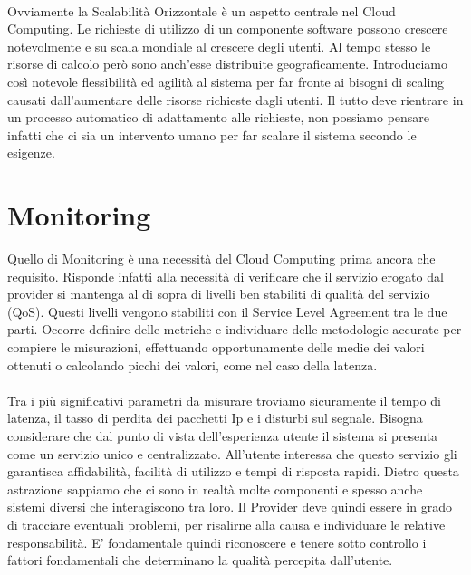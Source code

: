 \paragraph{}
Ovviamente la Scalabilità Orizzontale è un aspetto centrale nel Cloud Computing. Le richieste di utilizzo di un componente software possono crescere notevolmente e su scala mondiale al crescere degli utenti. Al tempo stesso le risorse di calcolo però sono anch'esse distribuite geograficamente. Introduciamo così notevole flessibilità ed agilità al sistema per far fronte ai bisogni di scaling causati dall'aumentare delle risorse richieste dagli utenti. Il tutto deve rientrare in un processo automatico di adattamento alle richieste, non possiamo pensare infatti che ci sia un intervento umano per far scalare il sistema secondo le esigenze.

\section{Monitoring}
Quello di Monitoring è una necessità del Cloud Computing prima ancora che requisito. Risponde infatti alla necessità di verificare che il servizio erogato dal provider si mantenga al di sopra di livelli ben stabiliti di qualità del servizio (QoS). Questi livelli vengono stabiliti con il Service Level Agreement tra le due parti. Occorre definire delle metriche e individuare delle metodologie accurate per compiere le misurazioni, effettuando opportunamente delle medie dei valori ottenuti o calcolando picchi dei valori, come nel caso della latenza.

\paragraph{}
Tra i più significativi parametri da misurare troviamo sicuramente il tempo di latenza, il tasso di perdita dei pacchetti Ip e i disturbi sul segnale. Bisogna considerare che dal punto di vista dell'esperienza utente il sistema si presenta come un servizio unico e centralizzato. All'utente interessa che questo servizio gli garantisca affidabilità, facilità di utilizzo e tempi di risposta rapidi. Dietro questa astrazione sappiamo che ci sono in realtà molte componenti e spesso anche sistemi diversi che interagiscono tra loro. Il Provider deve quindi essere in grado di tracciare eventuali problemi, per risalirne alla causa e individuare le relative responsabilità. E' fondamentale quindi riconoscere e tenere sotto controllo i fattori  fondamentali che determinano la qualità percepita dall'utente.




